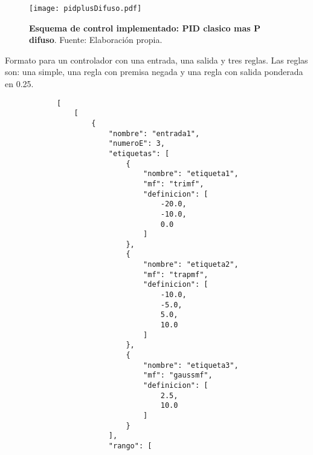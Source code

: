     \vfill

    \begin{figure}[htb]
        \centering
        \texttt{[image: pidplusDifuso.pdf]}
        \caption[Esquema de control implementado: PID clasico mas P difuso]{\textbf{Esquema de control implementado: PID clasico mas P difuso}. Fuente: Elaboración propia.} 
        \label{fig:pidplusDifuso}
    \end{figure}
    
    \vfill

    \begin{longlisting}
        \caption[Formato para guardar controlador]{Formato para un controlador con una entrada, una salida y tres reglas. Las reglas son: una simple, una regla con premisa negada y una regla con salida ponderada en 0.25.}
        \label{code:anexoE}				
        \begin{verbatim}
            [
                [
                    {
                        "nombre": "entrada1",
                        "numeroE": 3,
                        "etiquetas": [
                            {
                                "nombre": "etiqueta1",
                                "mf": "trimf",
                                "definicion": [
                                    -20.0,
                                    -10.0,
                                    0.0
                                ]
                            },
                            {
                                "nombre": "etiqueta2",
                                "mf": "trapmf",
                                "definicion": [
                                    -10.0,
                                    -5.0,
                                    5.0,
                                    10.0
                                ]
                            },
                            {
                                "nombre": "etiqueta3",
                                "mf": "gaussmf",
                                "definicion": [
                                    2.5,
                                    10.0
                                ]
                            }
                        ],
                        "rango": [

\end{verbatim}
\end{longlisting}
